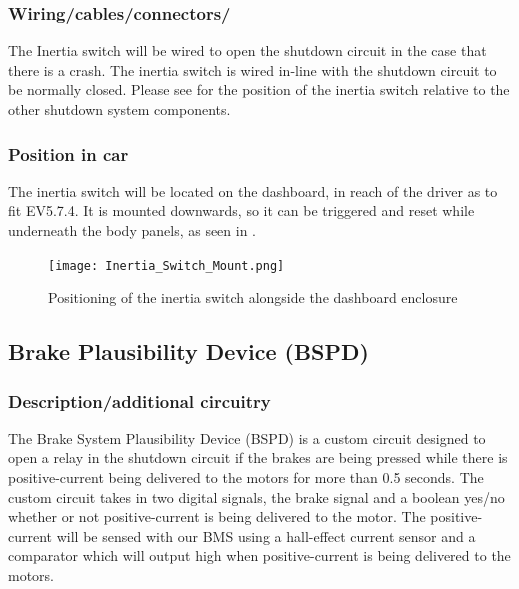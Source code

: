 \documentclass{article}
\begin{document}
\subsubsection{Wiring/cables/connectors/}
            The Inertia switch will be wired to open the shutdown circuit in the case that there is a crash. The inertia switch is wired in-line with the shutdown circuit to be normally closed. Please see  for the position of the inertia switch relative to the other shutdown system components.

\subsubsection{Position in car}
 The inertia switch will be located on the dashboard, in reach of the driver as to fit EV5.7.4. It is mounted downwards, so it can be triggered and reset while underneath the body panels, as seen in .

  \begin{figure}[H]
  \centering
  \texttt{[image: Inertia\_Switch\_Mount.png]}
  \caption{Positioning of the inertia switch alongside the dashboard enclosure}
  \label{fig:inertia_switch_mount}
  \end{figure}


\subsection{Brake Plausibility Device (BSPD)}\label{brake_plausibility_device}
\subsubsection{Description/additional circuitry}

The Brake System Plausibility Device (BSPD) is a custom circuit designed to open a relay in the shutdown circuit if the brakes are being pressed while there is positive-current being delivered to the motors for more than 0.5 seconds. The custom circuit takes in two digital signals, the brake signal and a boolean yes/no whether or not positive-current is being delivered to the motor. The positive-current will be sensed with our BMS using a hall-effect current sensor and a comparator which will output high when positive-current is being delivered to the motors. \\
\end{document}
